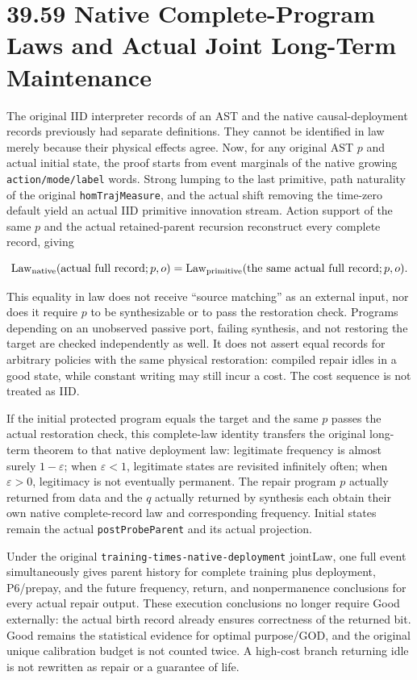\documentclass[
  english,
  11pt,
  oneside]{book}
\begin{document}
\section{39.59 Native Complete-Program Laws and Actual Joint Long-Term Maintenance}\label{native-complete-program-laws-and-actual-joint-long-term-maintenance}

The original IID interpreter records of an AST and the native causal-deployment records previously had separate definitions. They cannot be identified in law merely because their physical effects agree. Now, for any original AST \(p\) and actual initial state, the proof starts from event marginals of the native growing \nolinkurl{action/mode/label} words. Strong lumping to the last primitive, path naturality of the original \nolinkurl{homTrajMeasure}, and the actual shift removing the time-zero default yield an actual IID primitive innovation stream. Action support of the same \(p\) and the actual retained-parent recursion reconstruct every complete record, giving

\[\operatorname{Law}_{\rm native}(\text{actual full record};p,o)
=\operatorname{Law}_{\rm primitive}(\text{the same actual full record};p,o).\]

This equality in law does not receive ``source matching'' as an external input, nor does it require \(p\) to be synthesizable or to pass the restoration check. Programs depending on an unobserved passive port, failing synthesis, and not restoring the target are checked independently as well. It does not assert equal records for arbitrary policies with the same physical restoration: compiled repair idles in a good state, while constant writing may still incur a cost. The cost sequence is not treated as IID.

If the initial protected program equals the target and the same \(p\) passes the actual restoration check, this complete-law identity transfers the original long-term theorem to that native deployment law: legitimate frequency is almost surely \(1-\varepsilon\); when \(\varepsilon<1\), legitimate states are revisited infinitely often; when \(\varepsilon>0\), legitimacy is not eventually permanent. The repair program \(p\) actually returned from data and the \(q\) actually returned by synthesis each obtain their own native complete-record law and corresponding frequency. Initial states remain the actual \nolinkurl{postProbeParent} and its actual projection.

Under the original \nolinkurl{training-times-native-deployment} jointLaw, one full event simultaneously gives parent history for complete training plus deployment, P6/prepay, and the future frequency, return, and nonpermanence conclusions for every actual repair output. These execution conclusions no longer require Good externally: the actual birth record already ensures correctness of the returned bit. Good remains the statistical evidence for optimal purpose/GOD, and the original unique calibration budget is not counted twice. A high-cost branch returning idle is not rewritten as repair or a guarantee of life.
\end{document}
